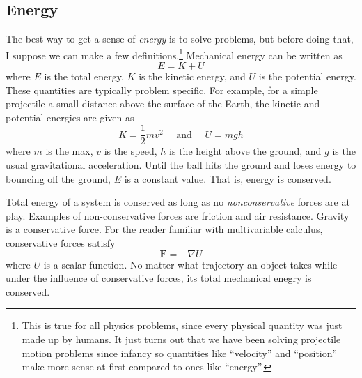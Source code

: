 \documentclass[titlepage]{article}
\begin{document}
\subsection{Energy}
The best way to get a sense of \textit{energy} is to solve problems, but before doing that, I suppose we can make a few definitions.\footnote{This is true for all physics problems, since every physical quantity was just made up by humans. It just turns out that we have been solving projectile motion problems since infancy so quantities like ``velocity'' and ``position'' make more sense at first compared to ones like ``energy''.} Mechanical energy can be written as 
\begin{equation}
    E = K + U
\end{equation} 
where $E$ is the total energy, $K$ is the kinetic energy, and $U$ is the potential energy. These quantities are typically problem specific. For example, for a simple projectile a small distance above the surface of the Earth, 
the kinetic and potential energies are given as 
\begin{equation}
    K = \frac{1}{2} m v^2 \quad \textrm{ and } \quad U = mgh
\end{equation}
where $m$ is the max, $v$ is the speed, $h$ is the height above the ground, and $g$ is the usual gravitational acceleration. Until the ball hits the ground and loses energy to bouncing off the ground, $E$ is a constant value. That is, energy is conserved.

Total energy of a system is conserved as long as no \textit{nonconservative} forces are at play. Examples of non-conservative forces are friction and air resistance. Gravity is a conservative force. For the reader familiar with multivariable calculus, conservative forces satisfy 
\begin{equation}
    \mathbf{F} = -\nabla U
\end{equation}
where $U$ is a scalar function. No matter what trajectory an object takes while under the influence of conservative forces, its total mechanical enegry is conserved.
\end{document}
